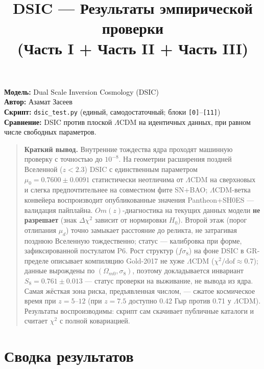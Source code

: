 \documentclass{article}
\begin{document}
\title{DSIC --- Результаты эмпирической проверки\\(Часть I + Часть II + Часть III)}
\date{}
\maketitle

\noindent\textbf{Модель:} Dual Scale Inversion Cosmology (DSIC)\\
\textbf{Автор:} Азамат Засеев\\
\textbf{Скрипт:} \texttt{dsic\_test.py} (единый, самодостаточный; блоки \texttt{[0]}--\texttt{[11]})\\
\textbf{Сравнение:} DSIC против плоской $\Lambda$CDM на идентичных данных, при равном числе свободных параметров.

\begin{quote}
\textbf{Краткий вывод.} Внутренние тождества ядра проходят машинную проверку с точностью до $10^{-8}$. На геометрии расширения поздней Вселенной ($z < 2.3$) DSIC с единственным параметром $\mu_0 = 0.7600 \pm 0.0091$ статистически неотличима от $\Lambda$CDM на сверхновых и слегка предпочтительнее на совместном фите SN+BAO; $\Lambda$CDM-ветка конвейера воспроизводит опубликованные значения Pantheon+SH0ES --- валидация пайплайна. $Om(z)$-диагностика на текущих данных модели \textbf{не разрешает} (знак $\Delta\chi^2$ зависит от нормировки $H_0$). Второй этаж (порог отлипания $\mu_d$) точно замыкает расстояние до реликта, не затрагивая позднюю Вселенную тождественно; статус --- калибровка при форме, зафиксированной постулатом P6. Рост структур ($f\sigma_8$) на фоне DSIC в GR-пределе описывает компиляцию Gold-2017 не хуже $\Lambda$CDM ($\chi^2/\text{dof} \approx 0.7$); данные вырождены по $(\Omega_{m0}, \sigma_8)$, поэтому докладывается инвариант $S_8 = 0.761 \pm 0.013$ --- статус проверки на выживание, не вывода из ядра. Самая жёсткая зона риска, предъявленная числом, --- сжатое космическое время при $z = 5\text{--}12$ (при $z = 7.5$ доступно 0.42 Гыр против 0.71 у $\Lambda$CDM). Результаты воспроизводимы: скрипт сам скачивает публичные каталоги и считает $\chi^2$ с полной ковариацией.
\end{quote}
\clearpage
\section{Сводка результатов}
\end{document}
